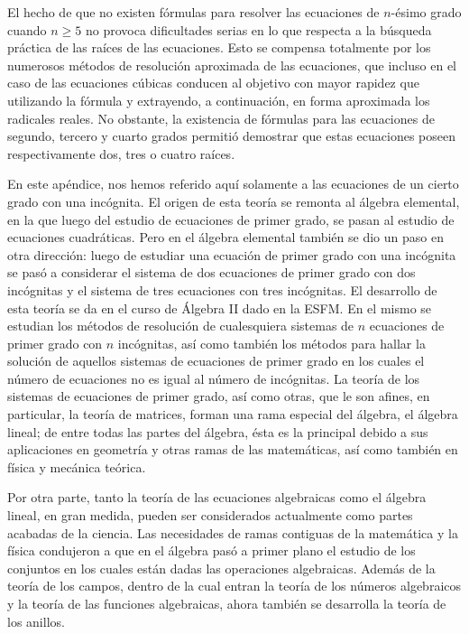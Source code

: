 El hecho de que no existen fórmulas para resolver las ecuaciones de $n$-ésimo grado cuando $n \geq 5$ no provoca dificultades serias en lo que respecta a la búsqueda práctica de las raíces de las ecuaciones. Esto se compensa totalmente por los numerosos métodos de resolución aproximada de las ecuaciones, que incluso en el caso de las ecuaciones cúbicas conducen al objetivo con mayor rapidez que utilizando la fórmula y extrayendo, a continuación, en forma aproximada los radicales reales. No obstante, la existencia de fórmulas para las ecuaciones de segundo, tercero y cuarto grados permitió demostrar que estas ecuaciones poseen respectivamente dos, tres o cuatro raíces.

En este apéndice, nos hemos referido aquí solamente a las ecuaciones de un cierto grado con una incógnita. El origen de esta teoría se remonta al álgebra elemental, en la que luego del estudio de ecuaciones de primer grado, se pasan al estudio de ecuaciones cuadráticas. Pero en el álgebra elemental también se dio un paso en otra dirección: luego de estudiar una ecuación de primer grado con una incógnita se pasó a considerar el sistema de dos ecuaciones de primer grado con dos incógnitas y el sistema de tres ecuaciones con tres incógnitas. El desarrollo de esta teoría se da en el curso de Álgebra II dado en la ESFM. En el mismo se estudian los métodos de resolución de cualesquiera sistemas de $n$ ecuaciones de primer grado con $n$ incógnitas, así como también los métodos para hallar la solución de aquellos sistemas de ecuaciones de primer grado en los cuales el número de ecuaciones no es igual al número de incógnitas. La teoría de los sistemas de ecuaciones de primer grado, así como otras, que le son afines, en particular, la teoría de matrices, forman una rama especial del álgebra, el álgebra lineal; de entre todas las partes del álgebra, ésta es la principal debido a sus aplicaciones en geometría y otras ramas de las matemáticas, así como también en física y mecánica teórica.

Por otra parte, tanto la teoría de las ecuaciones algebraicas como el álgebra lineal, en gran medida, pueden ser considerados actualmente como partes acabadas de la ciencia. Las necesidades de ramas contiguas de la matemática y la física condujeron a que en el álgebra pasó a primer plano el estudio de los conjuntos en los cuales están dadas las operaciones algebraicas. Además de la teoría de los campos, dentro de la cual entran la teoría de los números algebraicos y la teoría de las funciones algebraicas, ahora también se desarrolla la teoría de los anillos.